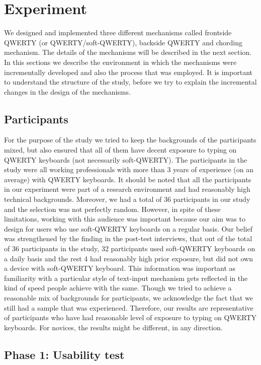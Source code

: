 \section{Experiment}

We designed and implemented three different mechanisms called frontside QWERTY (or QWERTY/soft-QWERTY), backside QWERTY and chording mechanism. The details of the mechanisms will be described in the next section. In this sections we describe the environment in which the mechanisms were incrementally developed and also the process that was employed. It is important to understand the structure of the study, before we try to explain the incremental changes in the design of the mechanisms.

\subsection{Participants}

For the purpose of the study we tried to keep the backgrounds of the
participants mixed, but also ensured that all of them have decent
exposure to typing on QWERTY keyboards (not necessarily
soft-QWERTY). The participants in the study were all working
professionals with more than 3 years of experience (on an average)
with QWERTY keyboards. It should be noted that all the participants in our experiment were part of a research environment and had reasonably high technical backgrounds. Moreover, we had a total of 36 participants in our study and the selection was not perfectly random. However, in spite of these limitations, working with this audience was important because our aim was to design for users who use soft-QWERTY keyboards on a regular basis. Our belief was strengthened by the finding in the post-test interviews, that out of the
total of 36 participants in the study, 32 participants used soft-QWERTY keyboards on a daily basis and the rest 4 had reasonably high prior exposure, but did not own a device with soft-QWERTY keyboard. This information was important
as familiarity with a particular style of text-input mechanism gets
reflected in the kind of speed people achieve with the same. Though we
tried to achieve a reasonable mix of backgrounds for participants, we
acknowledge the fact that we still had a sample that was
experienced. Therefore, our results are representative of participants
who have had reasonable level of exposure to typing on QWERTY
keyboards. For novices, the results might be different, in any
direction.

\subsection{Phase 1: Usability test}


